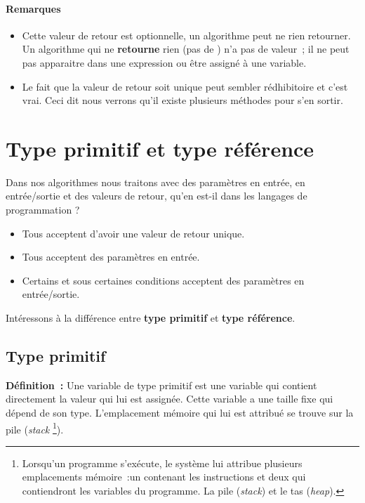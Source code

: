		\paragraph{Remarques} 
		\begin{itemize}
			
			\item Cette valeur de retour est optionnelle, un algorithme peut ne
				rien retourner.  Un algorithme qui ne \textbf{retourne} rien
				(pas de \Gives) n’a pas de valeur~; il ne peut pas apparaitre
				dans une expression ou être assigné à une variable.  

			\item Le fait que la valeur de retour soit unique peut sembler
				rédhibitoire et c'est vrai. Ceci dit nous verrons qu'il existe
				plusieurs méthodes pour s'en sortir.
		
		\end{itemize}
		



\section{Type primitif et type référence}
	\label{primitif-reference}

	Dans nos algorithmes nous traitons avec des paramètres en entrée, en
	entrée/sortie et des valeurs de retour, qu'en est-il dans les langages de
	programmation ? 

	\begin{itemize}
		\item Tous acceptent d'avoir une valeur de retour unique.
		\item Tous acceptent des paramètres en entrée. 
		\item Certains et sous certaines conditions acceptent des paramètres en 
			entrée/sortie.
	\end{itemize}

	Intéressons à la différence entre \textbf{type primitif} et \textbf{type
	référence}.

	\subsection{Type primitif}

	\label{variable}
	\textbf{Définition~:} 
	Une variable de type primitif est une variable qui contient directement la
	valeur qui lui est assignée.  Cette variable a une taille fixe qui dépend de
	son type. L'emplacement mémoire qui lui est attribué se trouve sur la pile
	(\textit{stack}
	\footnote{%
		Lorsqu'un programme s'exécute, le système lui attribue plusieurs
		emplacements mémoire~:un contenant les instructions et deux qui
		contiendront les variables du programme. La pile (\textit{stack}) et le
		tas (\textit{heap}).  
	}).
	
